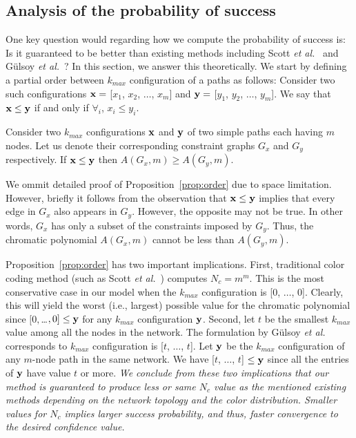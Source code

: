 \documentclass{ws-procs11x85}
\begin{document}
\subsection{Analysis of the probability of success}
\label{sec:theory}


One key question would regarding how we compute the probability of
success is: Is it guaranteed to be better than existing methods
including Scott {\it et al.}~\cite{scott} and G{\"u}lsoy {\it et
  al.}~\cite{gulsoy}? In this section, we answer this theoretically.
We start by defining a partial order between $k_{max}$ configuration
of a paths as follows: Consider two such configurations ${\bf x} =$
[$x_1$, $x_2$, $\ldots$, $x_m$] and ${\bf y} =$ [$y_1$, $y_2$,
$\ldots$, $y_m$]. We say that ${\bf x} \leq {\bf y}$ if and only if
$\forall_i$, $x_i \leq y_i$.


\begin{proposition}
  Consider two $k_{max}$ configurations ${\bf x}$ and ${\bf y}$ of two
  simple paths each having $m$ nodes. Let us denote their
  corresponding constraint graphs $G_x$ and $G_y$ respectively. If
  ${\bf x} \leq {\bf y}$ then $A(G_x, m) \geq A(G_y, m)$.
\label{prop:order}
\end{proposition}

We ommit detailed proof of Proposition~\ref{prop:order} due to space
limitation. However, briefly it follows from the observation that
${\bf x} \leq {\bf y}$ implies that every edge in $G_x$ also appears
in $G_y$. However, the opposite may not be true. In other words, $G_x$
has only a subset of the constraints imposed by $G_y$. Thus, the
chromatic polynomial $A(G_x, m)$ cannot be less than $A(G_y, m)$.

Proposition~\ref{prop:order} has two important implications. First,
traditional color coding method (such as Scott {\it et al.}~\cite{scott})
computes $N_c = m^m$. This is the most conservative case in our model
when the $k_{max}$ configuration is [0, $\ldots$, 0].  Clearly, this
will yield the worst (i.e., largest) possible value for the chromatic
polynomial since $[0, $\ldots$, 0] \leq {\bf y}$ for any $k_{max}$
configuration ${\bf y}$. Second, let $t$ be the smallest $k_{max}$
value among all the nodes in the network. The formulation by
G{\"u}lsoy {\it et al.}~\cite{gulsoy} corresponds to $k_{max}$ configuration
is [$t$, $\ldots$, $t$]. Let ${\bf y}$ be the $k_{max}$ configuration
of any $m$-node path in the same network. We have [$t$, $\ldots$, $t$]
$\leq {\bf y}$ since all the entries of ${\bf y}$ have value $t$ or
more.  {\em We conclude from these two implications that our method is
  guaranteed to produce less or same $N_c$ value as the mentioned
  existing methods depending on the network topology and the color
  distribution.  Smaller values for $N_c$ implies larger success
  probability, and thus, faster convergence to the desired confidence
  value.}
\end{document}
